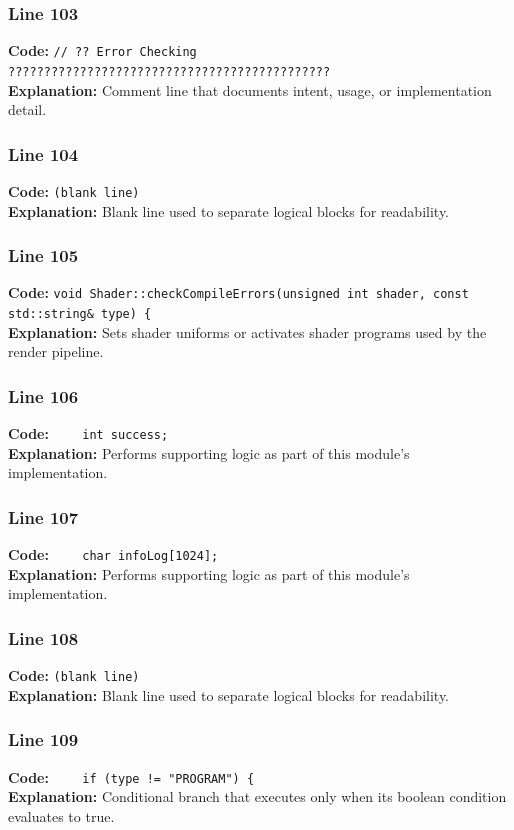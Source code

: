 \documentclass[11pt,a4paper]{article}
\begin{document}
\subsubsection*{Line 103}
\textbf{Code:} \verb|// ?? Error Checking ?????????????????????????????????????????????|\\
\textbf{Explanation:} Comment line that documents intent, usage, or implementation detail.

\subsubsection*{Line 104}
\textbf{Code:} \texttt{(blank line)}\\
\textbf{Explanation:} Blank line used to separate logical blocks for readability.

\subsubsection*{Line 105}
\textbf{Code:} \verb|void Shader::checkCompileErrors(unsigned int shader, const std::string& type) {|\\
\textbf{Explanation:} Sets shader uniforms or activates shader programs used by the render pipeline.

\subsubsection*{Line 106}
\textbf{Code:} \verb|    int success;|\\
\textbf{Explanation:} Performs supporting logic as part of this module's implementation.

\subsubsection*{Line 107}
\textbf{Code:} \verb|    char infoLog[1024];|\\
\textbf{Explanation:} Performs supporting logic as part of this module's implementation.

\subsubsection*{Line 108}
\textbf{Code:} \texttt{(blank line)}\\
\textbf{Explanation:} Blank line used to separate logical blocks for readability.

\subsubsection*{Line 109}
\textbf{Code:} \verb|    if (type != "PROGRAM") {|\\
\textbf{Explanation:} Conditional branch that executes only when its boolean condition evaluates to true.
\end{document}
